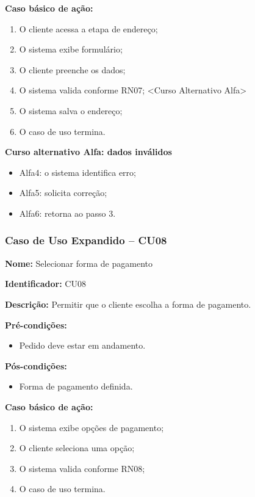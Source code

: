 \documentclass[12pt]{article}
\begin{document}
\textbf{Caso básico de ação:}
\begin{enumerate}
\item O cliente acessa a etapa de endereço;
\item O sistema exibe formulário;
\item O cliente preenche os dados;
\item O sistema valida conforme RN07; <Curso Alternativo Alfa>
\item O sistema salva o endereço;
\item O caso de uso termina.
\end{enumerate}

\textbf{Curso alternativo Alfa: dados inválidos}

\begin{itemize}
\item Alfa4: o sistema identifica erro;
\item Alfa5: solicita correção;
\item Alfa6: retorna ao passo 3.
\end{itemize}


\subsubsection{Caso de Uso Expandido -- CU08}

\textbf{Nome:} Selecionar forma de pagamento

\textbf{Identificador:} CU08

\textbf{Descrição:} Permitir que o cliente escolha a forma de pagamento.

\textbf{Pré-condições:}
\begin{itemize}
\item Pedido deve estar em andamento.
\end{itemize}

\textbf{Pós-condições:}
\begin{itemize}
\item Forma de pagamento definida.
\end{itemize}

\textbf{Caso básico de ação:}
\begin{enumerate}
\item O sistema exibe opções de pagamento;
\item O cliente seleciona uma opção;
\item O sistema valida conforme RN08;
\item O caso de uso termina.
\end{enumerate}
\end{document}
